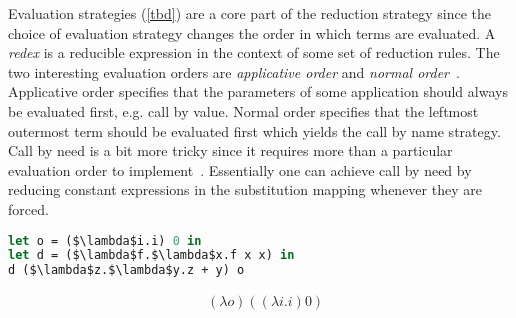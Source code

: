 \documentclass[11pt,oneside,a4paper]{report}
\begin{document}
Evaluation strategies (\autoref{tbd}) are a core part of the reduction strategy since the choice of evaluation strategy changes the order in which terms are evaluated.
A \textit{redex} is a reducible expression in the context of some set of reduction rules.
The two interesting evaluation orders are \textit{applicative order} and \textit{normal order}~\cite{sestoft2002demonstrating}.
Applicative order specifies that the parameters of some application should always be evaluated first, e.g. call by value.
Normal order specifies that the leftmost outermost term should be evaluated first which yields the call by name strategy.
Call by need is a bit more tricky since it requires more than a particular evaluation order to implement~\cite{levy1988sharing}.
Essentially one can achieve call by need by reducing constant expressions in the substitution mapping whenever they are forced.
\begin{lstlisting}[language=ML,caption={Object duplication},label={lst:objdup},mathescape=true]
let o = ($\lambda$i.i) 0 in
let d = ($\lambda$f.$\lambda$x.f x x) in
d ($\lambda$z.$\lambda$y.z + y) o
\end{lstlisting}
\begin{align}
    &(\lambda o)((\lambda i . i) 0)
\end{align}
\end{document}
